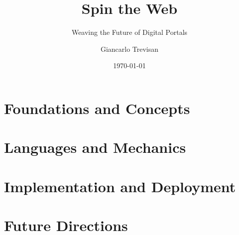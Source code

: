 \documentclass[11pt,openright,twoside,a4paper]{book}
\title{Spin the Web}
\subtitle{Weaving the Future of Digital Portals}
\author{Giancarlo Trevisan}
\date{\today}
\begin{document}
\frontmatter





\tableofcontents

\mainmatter

\part{Foundations and Concepts}






\part{Languages and Mechanics}






\part{Implementation and Deployment}



\part{Future Directions}



\backmatter


\printindex
\end{document}
